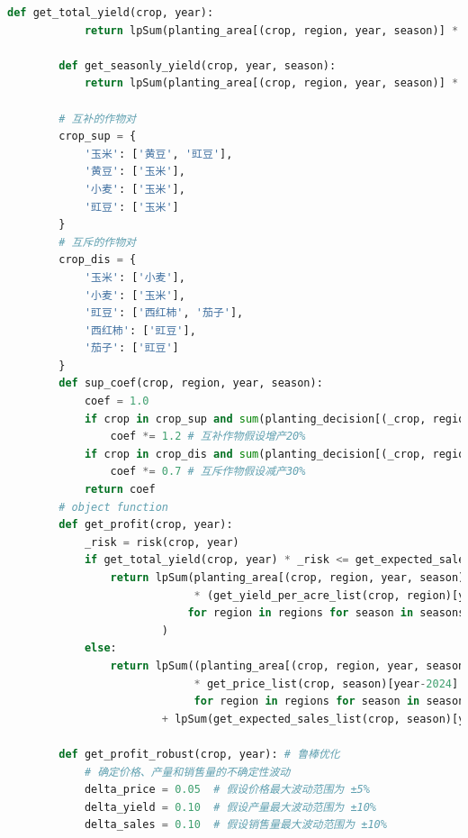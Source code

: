 \documentclass[withoutpreface]{cumcmthesis}
\begin{document}
\begin{appendices}
\begin{lstlisting}[language=python]
        def get_total_yield(crop, year):
            return lpSum(planting_area[(crop, region, year, season)] * get_yield_per_acre_list(crop, region)[year-2024] for region in regions for season in seasons)
        
        def get_seasonly_yield(crop, year, season):
            return lpSum(planting_area[(crop, region, year, season)] * get_yield_per_acre_list(crop, region)[year-2024] for region in regions)
    
        # 互补的作物对
        crop_sup = {
            '玉米': ['黄豆', '豇豆'],
            '黄豆': ['玉米'],
            '小麦': ['玉米'],
            '豇豆': ['玉米']
        }
        # 互斥的作物对
        crop_dis = {
            '玉米': ['小麦'],
            '小麦': ['玉米'],
            '豇豆': ['西红柿', '茄子'],
            '西红柿': ['豇豆'],
            '茄子': ['豇豆']
        }
        def sup_coef(crop, region, year, season):
            coef = 1.0
            if crop in crop_sup and sum(planting_decision[(_crop, region, year, season)] for _crop in crop_sup[crop]) >= 1:
                coef *= 1.2 # 互补作物假设增产20%
            if crop in crop_dis and sum(planting_decision[(_crop, region, year, season)] for _crop in crop_dis[crop]) >= 1:
                coef *= 0.7 # 互斥作物假设减产30%
            return coef
        # object function
        def get_profit(crop, year):
            _risk = risk(crop, year)
            if get_total_yield(crop, year) * _risk <= get_expected_sales_list(crop, '第一季')[year-2024] + get_expected_sales_list(crop, '第二季')[year-2024]:
                return lpSum(planting_area[(crop, region, year, season)]
                             * (get_yield_per_acre_list(crop, region)[year-2024] * get_price_list(crop, season)[year-2024] * _risk - get_cost_list(crop, region)[year-2024])
                            for region in regions for season in seasons
                        )
            else:
                return lpSum((planting_area[(crop, region, year, season)] * get_yield_per_acre_list(crop, region)[year-2024] - get_expected_sales_list(crop, season)[year-2024] - get_cost_list(crop, region)[year-2024])
                             * get_price_list(crop, season)[year-2024] * (1 - reduction_factor) 
                             for region in regions for season in seasons) \
                        + lpSum(get_expected_sales_list(crop, season)[year-2024] * get_price_list(crop, season)[year-2024] for season in seasons)
            
        def get_profit_robust(crop, year): # 鲁棒优化
            # 确定价格、产量和销售量的不确定性波动
            delta_price = 0.05  # 假设价格最大波动范围为 ±5%
            delta_yield = 0.10  # 假设产量最大波动范围为 ±10%
            delta_sales = 0.10  # 假设销售量最大波动范围为 ±10%
    

\end{lstlisting}
\end{appendices}
\end{document}
